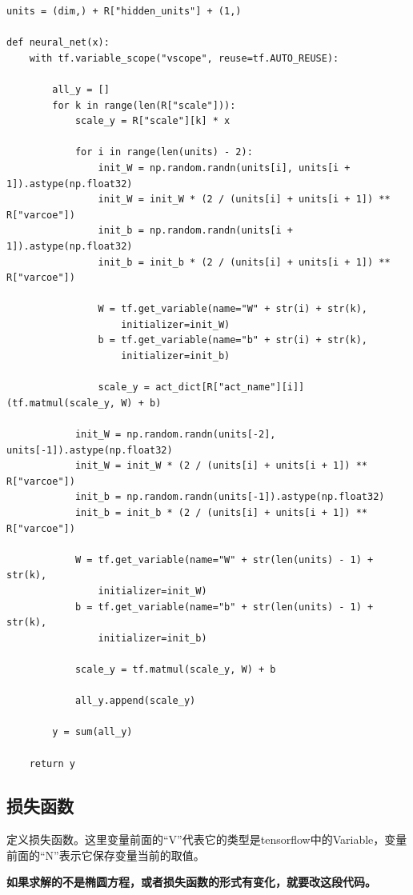 \documentclass[12pt,a4paper]{article}
\begin{document}
\begin{lstlisting}
units = (dim,) + R["hidden_units"] + (1,)

def neural_net(x):
    with tf.variable_scope("vscope", reuse=tf.AUTO_REUSE):

        all_y = []
        for k in range(len(R["scale"])):
            scale_y = R["scale"][k] * x

            for i in range(len(units) - 2):
                init_W = np.random.randn(units[i], units[i + 1]).astype(np.float32)
                init_W = init_W * (2 / (units[i] + units[i + 1]) ** R["varcoe"])
                init_b = np.random.randn(units[i + 1]).astype(np.float32)
                init_b = init_b * (2 / (units[i] + units[i + 1]) ** R["varcoe"])

                W = tf.get_variable(name="W" + str(i) + str(k),
                    initializer=init_W)
                b = tf.get_variable(name="b" + str(i) + str(k),
                    initializer=init_b)

                scale_y = act_dict[R["act_name"][i]](tf.matmul(scale_y, W) + b)

            init_W = np.random.randn(units[-2], units[-1]).astype(np.float32)
            init_W = init_W * (2 / (units[i] + units[i + 1]) ** R["varcoe"])
            init_b = np.random.randn(units[-1]).astype(np.float32)
            init_b = init_b * (2 / (units[i] + units[i + 1]) ** R["varcoe"])

            W = tf.get_variable(name="W" + str(len(units) - 1) + str(k),
                initializer=init_W)
            b = tf.get_variable(name="b" + str(len(units) - 1) + str(k),
                initializer=init_b)

            scale_y = tf.matmul(scale_y, W) + b

            all_y.append(scale_y)

        y = sum(all_y)

    return y
\end{lstlisting}

\subsection*{损失函数}

定义损失函数。这里变量前面的“V”代表它的类型是tensorflow中的Variable，变量前面的“N”表示它保存变量当前的取值。

\textbf{如果求解的不是椭圆方程，或者损失函数的形式有变化，就要改这段代码。}
\end{document}
